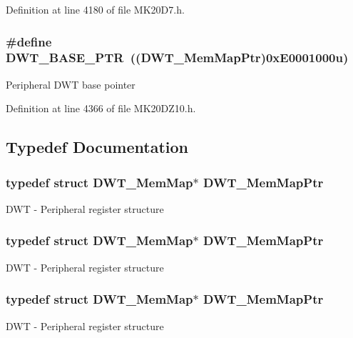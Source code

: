 Definition at line 4180 of file M\+K20\+D7.\+h.

\subsubsection[{\texorpdfstring{D\+W\+T\+\_\+\+B\+A\+S\+E\+\_\+\+P\+TR}{DWT_BASE_PTR}}]{\setlength{\rightskip}{0pt plus 5cm}\#define D\+W\+T\+\_\+\+B\+A\+S\+E\+\_\+\+P\+TR~(({\bf D\+W\+T\+\_\+\+Mem\+Map\+Ptr})0x\+E0001000u)}\hypertarget{group___d_w_t___peripheral_ga3b46dfb2ea7946c6938028d879c82cb1}{}\label{group___d_w_t___peripheral_ga3b46dfb2ea7946c6938028d879c82cb1}
Peripheral D\+WT base pointer 

Definition at line 4366 of file M\+K20\+D\+Z10.\+h.



\subsection{Typedef Documentation}
\subsubsection[{\texorpdfstring{D\+W\+T\+\_\+\+Mem\+Map\+Ptr}{DWT_MemMapPtr}}]{\setlength{\rightskip}{0pt plus 5cm}typedef struct {\bf D\+W\+T\+\_\+\+Mem\+Map}$\ast$ {\bf D\+W\+T\+\_\+\+Mem\+Map\+Ptr}}\hypertarget{group___d_w_t___peripheral_ga8a09a1b28d871c18ae8c69f67af6d573}{}\label{group___d_w_t___peripheral_ga8a09a1b28d871c18ae8c69f67af6d573}
D\+WT -\/ Peripheral register structure 
\subsubsection[{\texorpdfstring{D\+W\+T\+\_\+\+Mem\+Map\+Ptr}{DWT_MemMapPtr}}]{\setlength{\rightskip}{0pt plus 5cm}typedef struct {\bf D\+W\+T\+\_\+\+Mem\+Map}$\ast$ {\bf D\+W\+T\+\_\+\+Mem\+Map\+Ptr}}\hypertarget{group___d_w_t___peripheral_ga8a09a1b28d871c18ae8c69f67af6d573}{}\label{group___d_w_t___peripheral_ga8a09a1b28d871c18ae8c69f67af6d573}
D\+WT -\/ Peripheral register structure 
\subsubsection[{\texorpdfstring{D\+W\+T\+\_\+\+Mem\+Map\+Ptr}{DWT_MemMapPtr}}]{\setlength{\rightskip}{0pt plus 5cm}typedef struct {\bf D\+W\+T\+\_\+\+Mem\+Map}$\ast$ {\bf D\+W\+T\+\_\+\+Mem\+Map\+Ptr}}\hypertarget{group___d_w_t___peripheral_ga8a09a1b28d871c18ae8c69f67af6d573}{}\label{group___d_w_t___peripheral_ga8a09a1b28d871c18ae8c69f67af6d573}
D\+WT -\/ Peripheral register structure 
